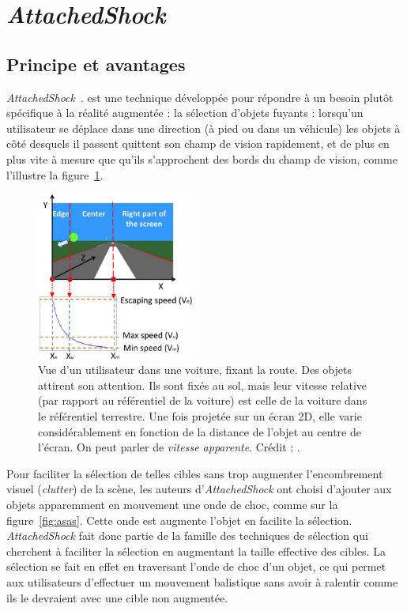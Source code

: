 \section{\emph{AttachedShock}}
	\subsection{Principe et avantages}
	\emph{AttachedShock}~\cite{you2012attachedshock, you2014attachedshock}. est une technique développée pour répondre à un besoin plutôt spécifique à la réalité augmentée : la sélection d'objets \og fuyants \fg{} : lorsqu'un utilisateur se déplace dans une direction (à pied ou dans un véhicule) les objets à côté desquels il passent quittent son champ de vision rapidement, et de plus en plus vite à mesure que qu'ils s'approchent des bords du champ de vision, comme l'illustre la figure~\ref{fig:as2dspeed}.

	\begin{figure} %
		\centering
		\includegraphics[width=0.46\textwidth]{figures/ch2/as2dspeed}
		\caption[\emph{AttachedShock}, profil de vitesse]{Vue d'un utilisateur dans une voiture, fixant la route. Des objets attirent son attention. Ils sont fixés au sol, mais leur vitesse relative (par rapport au référentiel de la voiture) est celle de la voiture dans le référentiel terrestre. Une fois projetée sur un écran 2D, elle varie considérablement en fonction de la distance de l'objet au centre de l'écran. On peut parler de \emph{vitesse apparente}. Crédit : \cite{you2012attachedshock}.}
		\label{fig:as2dspeed}
	\end{figure}
	
	Pour faciliter la sélection de telles cibles sans trop augmenter l'encombrement visuel (\emph{clutter}) de la scène, les auteurs d'\emph{AttachedShock} ont choisi d'ajouter aux objets apparemment en mouvement une onde de choc, comme sur la figure~\ref{fig:asas}. Cette onde est augmente l'objet en facilite la sélection. \emph{AttachedShock} fait donc partie de la famille des techniques de sélection qui cherchent à faciliter la sélection en augmentant la taille effective des cibles. La sélection se fait en effet en \og traversant \fg{} l'onde de choc d'un objet, ce qui permet aux utilisateurs d'effectuer un mouvement balistique sans avoir à ralentir comme ils le devraient avec une cible non augmentée.
	
